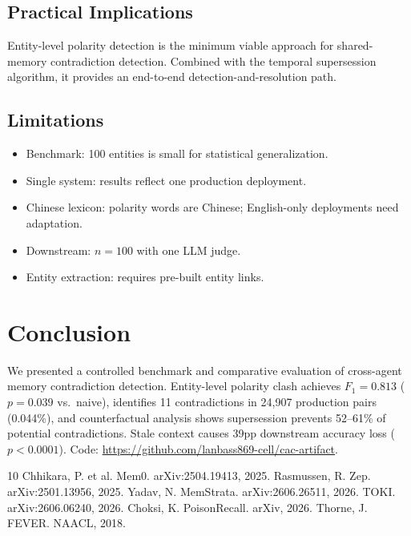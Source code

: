 \documentclass{article}
\begin{document}
\subsection{Practical Implications}
Entity-level polarity detection is the minimum viable approach for shared-memory contradiction detection. Combined with the temporal supersession algorithm, it provides an end-to-end detection-and-resolution path.

\subsection{Limitations}
\begin{itemize}
\item Benchmark: 100 entities is small for statistical generalization.
\item Single system: results reflect one production deployment.
\item Chinese lexicon: polarity words are Chinese; English-only deployments need adaptation.
\item Downstream: $n{=}100$ with one LLM judge.
\item Entity extraction: requires pre-built entity links.
\end{itemize}

\section{Conclusion}
We presented a controlled benchmark and comparative evaluation of cross-agent memory contradiction detection. Entity-level polarity clash achieves $F_1 = 0.813$ ($p = 0.039$ vs.\ naive), identifies 11 contradictions in 24{,}907 production pairs (0.044\%), and counterfactual analysis shows supersession prevents 52--61\% of potential contradictions. Stale context causes 39pp downstream accuracy loss ($p < 0.0001$). Code: \url{https://github.com/lanbass869-cell/cac-artifact}.

\begin{thebibliography}{10}
 Chhikara, P. et al. Mem0. arXiv:2504.19413, 2025.
 Rasmussen, R. Zep. arXiv:2501.13956, 2025.
 Yadav, N. MemStrata. arXiv:2606.26511, 2026.
 TOKI. arXiv:2606.06240, 2026.
 Choksi, K. PoisonRecall. arXiv, 2026.
 Thorne, J. FEVER. NAACL, 2018.
\end{thebibliography}
\end{document}
